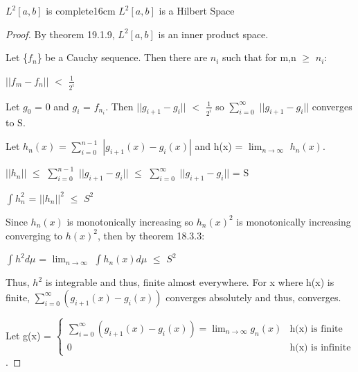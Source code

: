     \newpage



    \begin{wtheorem}{$L^2[a,b]$ is complete}{16cm}
        $L^2[a,b]$ is a Hilbert Space
    \end{wtheorem}

    \begin{proof}
        By {\color{red} theorem 19.1.9}, $L^2[a,b]$ is an inner product space.

        Let \{$f_n$\} be a Cauchy sequence.
        Then there are $n_i$ such that for m,n $\geq$ $n_i$:

        \hspace{0.5cm}
        $||f_m - f_n||$ $<$ $\frac{1}{2^i}$

        Let $g_0$ = 0 and $g_i$ = $f_{n_i}$.
        Then $||g_{i+1} - g_i||$ $<$ $\frac{1}{2^i}$
        so $\sum_{i=0}^{\infty}$ $||g_{i+1} - g_i||$ converges to S.

        Let $h_n(x)$ = $\sum_{i=0}^{n-1}$ $|g_{i+1}(x) - g_i(x)|$
        and h(x) = $\lim_{n \rightarrow \infty}$ $h_n(x)$.

        \hspace{0.5cm}
        $||h_n||$
        $\leq$ $\sum_{i=0}^{n-1}$ $||g_{i+1} - g_i||$
        $\leq$ $\sum_{i=0}^{\infty}$ $||g_{i+1} - g_i||$
        = S

        \hspace{0.5cm}
        $\int h_n^2$ = $||h_n||^2$ $\leq$ $S^2$

        Since $h_n(x)$ is monotonically increasing
        so $h_n(x)^2$ is monotonically increasing converging to $h(x)^2$,
        then by {\color{red} theorem 18.3.3}:

        \hspace{0.5cm}
        $\int h^2 d\mu$ = $\lim_{n \rightarrow \infty}$ $\int h_n(x) d\mu$
        $\leq$ $S^2$

        Thus, $h^2$ is integrable and thus, finite almost everywhere.
        For x where h(x) is finite, $\sum_{i=0}^{\infty} (g_{i+1}(x) - g_i(x))$
        converges absolutely and thus, converges.
        
        Let g(x) =
        $\begin{cases}
            \sum_{i=0}^{\infty} (g_{i+1}(x) - g_i(x))
                = \lim_{n \rightarrow \infty} g_n(x) & \text{h(x) is finite} \\
            0 & \text{h(x) is infinite}
        \end{cases}$.


\end{proof}
